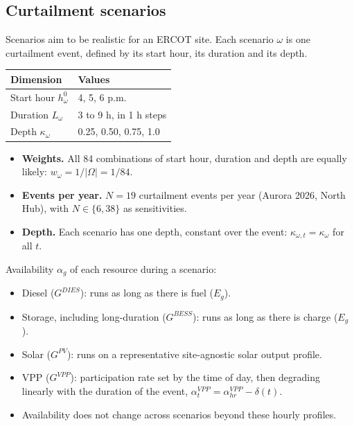 \documentclass{article}
\begin{document}
\subsection{Curtailment scenarios} %

Scenarios aim to be realistic for an ERCOT site. Each scenario $\omega$ is one
curtailment event, defined by its start hour, its duration and its depth.

\begin{center}
\small
\begin{tabular}{ll}
\toprule
Dimension & Values \\
\midrule
Start hour $h^{0}_\omega$ & 4, 5, 6 p.m. \\
Duration $L_\omega$ & 3 to 9 h, in 1 h steps \\
Depth $\kappa_\omega$ & 0.25, 0.50, 0.75, 1.0 \\
\bottomrule
\end{tabular}
\end{center}

\begin{itemize}
    \item \textbf{Weights.} All 84 combinations of start hour, duration and depth are equally likely: $w_\omega = 1/|\Omega| = 1/84$.
    \item \textbf{Events per year.} $N = 19$ curtailment events per year (Aurora 2026, North Hub), with $N \in \{6, 38\}$ as sensitivities.
    \item \textbf{Depth.} Each scenario has one depth, constant over the event: $\kappa_{\omega,t} = \kappa_\omega$ for all $t$. 
\end{itemize}

\noindent Availability $\alpha_g$ of each resource during a scenario:
\begin{itemize}
    \item Diesel ($G^{DIES}$): runs as long as there is fuel ($E_g$).
    \item Storage, including long-duration ($G^{BESS}$): runs as long as there is charge ($E_g$).
    \item Solar ($G^{PV}$): runs on a representative site-agnostic solar output profile.
    \item VPP ($G^{VPP}$): participation rate set by the time of day, then degrading linearly with the duration of the event, $\alpha^{VPP}_t = \alpha^{VPP}_{hr} - \delta(t)$.
    \item Availability does not change across scenarios beyond these hourly profiles.
\end{itemize}
\end{document}
